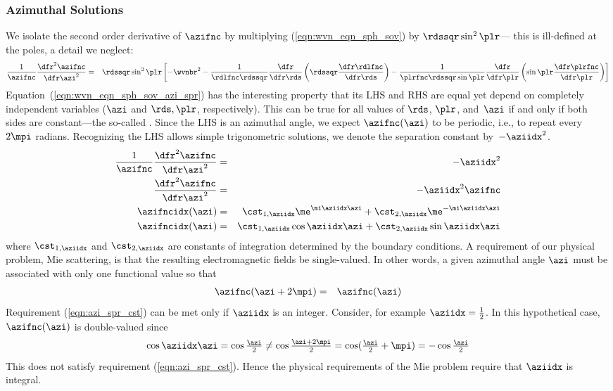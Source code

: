 \documentclass[12pt]{article}
\begin{document}
\subsubsection[Azimuthal Solutions]{Azimuthal Solutions}\label{sxn:mie_azi}
We isolate the second order derivative of $\azifnc$ by multiplying
(\ref{eqn:wvn_eqn_sph_sov}) by $\rdssqr\sin^{2}\plr$---
this is ill-defined at the poles, a detail we neglect:
\begin{eqnarray}
\frac{1}{\azifnc} \frac{\dfr^{2}\azifnc}{\dfr\azi^{2}}
& = & \rdssqr\sin^{2}\plr \left[ -\wvnbr^{2} -
\frac{1}{\rdlfnc\rdssqr} \frac{\dfr}{\dfr\rds} 
\left( \rdssqr \frac{\dfr\rdlfnc}{\dfr\rds} \right) -
\frac{1}{\plrfnc\rdssqr\sin\plr} \frac{\dfr}{\dfr\plr}
\left( \sin\plr \frac{\dfr\plrfnc}{\dfr\plr} \right) 
\right]
\label{eqn:wvn_eqn_sph_sov_azi_spr}
\end{eqnarray}
Equation~(\ref{eqn:wvn_eqn_sph_sov_azi_spr}) has the interesting
property that its LHS and RHS are equal yet depend on completely
independent variables ($\azi$ and $\rds,\plr$, respectively).
This can be true for all values of $\rds$, $\plr$, and~$\azi$ if and
only if both sides are constant---the so-called 
.
Since the LHS is an azimuthal angle, we expect $\azifnc(\azi)$ to be
periodic, i.e., to repeat every $2\mpi$ radians.
Recognizing the LHS allows simple trigonometric solutions, we denote
the separation constant by~$-\aziidx^{2}$.
\begin{eqnarray}
\frac{1}{\azifnc} \frac{\dfr^{2}\azifnc}{\dfr\azi^{2}} & = &
-\aziidx^{2} \nonumber \\
\frac{\dfr^{2}\azifnc}{\dfr\azi^{2}} & = & -\aziidx^{2}\azifnc \nonumber \\
\azifncidx(\azi) & = & \cst_{1,\aziidx}\me^{\mi\aziidx\azi} + \cst_{2,\aziidx}\me^{-\mi\aziidx\azi} \\ 
\azifncidx(\azi) & = & \cst_{1,\aziidx}\cos\aziidx\azi + \cst_{2,\aziidx}\sin\aziidx\azi
\label{eqn:wvn_eqn_sph_azi_sln}
\end{eqnarray}
where $\cst_{1,\aziidx}$ and $\cst_{2,\aziidx}$ are constants of
integration determined by the boundary conditions. 
A requirement of our physical problem, Mie scattering, is that
the resulting electromagnetic fields be single-valued.
In other words, a given azimuthal angle $\azi$ must be associated
with only one functional value so that
\begin{eqnarray}
\azifnc(\azi + 2\mpi) & = & \azifnc(\azi)
\label{eqn:azi_spr_cst}
\end{eqnarray}
Requirement (\ref{eqn:azi_spr_cst}) can be met only if $\aziidx$
is an integer. 
Consider, for example $\aziidx = \tfrac{1}{2}$.
In this hypothetical case, $\azifnc(\azi)$ is double-valued since
\begin{equation}
\cos\aziidx\azi = \cos\tfrac{\azi}{2} \neq \cos\tfrac{\azi+2\mpi}{2}
= \cos(\tfrac{\azi}{2}+\mpi) = -\cos\tfrac{\azi}{2}
\label{eqn:azi_spr_sng_val}
\end{equation}
This does not satisfy requirement (\ref{eqn:azi_spr_cst}).
Hence the physical requirements of the Mie problem require that
$\aziidx$ is integral.
\end{document}
